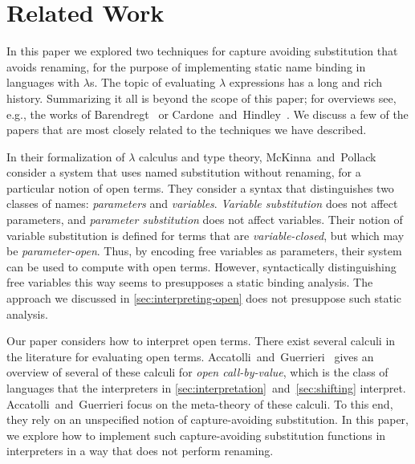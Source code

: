 \section{Related Work}
\label{sec:related}

In this paper we explored two techniques for capture avoiding substitution that avoids renaming, for the purpose of implementing static name binding in languages with $\lambda$s.
The topic of evaluating $\lambda$ expressions has a long and rich history.
Summarizing it all is beyond the scope of this paper; for overviews see, e.g., the works of Barendregt~\cite{DBLP:journals/bsl/Barendregt97} or Cardone~and~Hindley~\cite{hindley-lambda-history}.
We discuss a few of the papers that are most closely related to the techniques we have described.

In their formalization of $\lambda$ calculus and type theory, McKinna~and~Pollack~\cite{DBLP:journals/jar/McKinnaP99} consider a system that uses named substitution without renaming, for a particular notion of open terms.
They consider a syntax that distinguishes two classes of names: \emph{parameters} and \emph{variables}.
\emph{Variable substitution} does not affect parameters, and \emph{parameter substitution} does not affect variables.
Their notion of variable substitution is defined for terms that are \emph{variable-closed}, but which may be \emph{parameter-open}.
Thus, by encoding free variables as parameters, their system can be used to compute with open terms.
However, syntactically distinguishing free variables this way seems to presupposes a static binding analysis.
The approach we discussed in \cref{sec:interpreting-open} does not presuppose such static analysis.

Our paper considers how to interpret open terms.
There exist several calculi in the literature for evaluating open terms.
Accatolli~and~Guerrieri~\cite{DBLP:conf/aplas/AccattoliG16} gives an overview of several of these calculi for \emph{open call-by-value}, which is the class of languages that the interpreters in \cref{sec:interpretation}~and~\cref{sec:shifting} interpret.
Accatolli~and~Guerrieri focus on the meta-theory of these calculi.
To this end, they rely on an unspecified notion of capture-avoiding substitution.
In this paper, we explore how to implement such capture-avoiding substitution functions in interpreters in a way that does not perform renaming.



